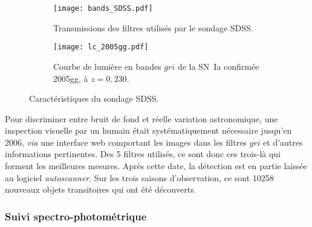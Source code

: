 \documentclass[../main/main.tex]{subfiles}
\begin{document}
\begin{figure}[ht]
    \centering
    \begin{subfigure}[]{.49\linewidth}
        \centering
        \texttt{[image: bands\_SDSS.pdf]}
        \captionsetup{justification=centering}
        \caption{Transmissions des filtres utilisés par le sondage SDSS.}
        \label{fig:sdssbands}
    \end{subfigure}
    \begin{subfigure}[]{.49\linewidth}
        \centering
        \texttt{[image: lc\_2005gg.pdf]}
        \captionsetup{justification=centering}
        \caption{Courbe de lumière en bandes $gri$ de la SN~Ia
            confirmée 2005gg, à $z = 0,230$.}
        \label{fig:sdsslc}
    \end{subfigure}
    \caption{Caractéristiques du sondage SDSS.}
\end{figure}

% 

Pour discriminer entre bruit de fond et réelle variation astronomique, une
inspection visuelle par un humain était systématiquement nécessaire jusqu'en
2006, \textit{via} une interface web comportant les images dans les filtres
$gri$ et d'autres informations pertinentes. Des 5 filtres utilisés, ce sont donc
ces trois-là qui forment les meilleures mesures. Après cette date, la détection
est en partie laissée au logiciel \textit{autoscanner}. Sur les trois saisons
d'observation, ce sont 10258 nouveaux objets transitoires qui ont été
découverts.

\subsubsection{Suivi spectro-photométrique}\label{sssec:sdssspectro}
\end{document}
